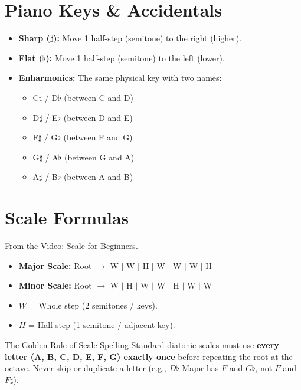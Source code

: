 
\section{Piano Keys \& Accidentals}

\begin{itemize}
    \item \textbf{Sharp ($\sharp$):} Move 1 half-step (semitone) to the right (higher).
    \item \textbf{Flat ($\flat$):} Move 1 half-step (semitone) to the left (lower).
    \item \textbf{Enharmonics:} The same physical key with two names:
    \begin{itemize}
        \item C$\sharp$ / D$\flat$ (between C and D)
        \item D$\sharp$ / E$\flat$ (between D and E)
        \item F$\sharp$ / G$\flat$ (between F and G)
        \item G$\sharp$ / A$\flat$ (between G and A)
        \item A$\sharp$ / B$\flat$ (between A and B)
    \end{itemize}
\end{itemize}

\section{Scale Formulas}

From the \href{https://www.youtube.com/watch?v=GugYaekR8KQ}{Video: Scale for Beginners}.

\begin{itemize}
    \item \textbf{Major Scale:} Root $\rightarrow$ W $\mid$ W $\mid$ H $\mid$ W $\mid$ W $\mid$ W $\mid$ H
    \item \textbf{Minor Scale:} Root $\rightarrow$ W $\mid$ H $\mid$ W $\mid$ W $\mid$ H $\mid$ W $\mid$ W
    \item $W$ = Whole step (2 semitones / keys).
    \item $H$ = Half step (1 semitone / adjacent key).
\end{itemize}

\begin{warningbox}{The Golden Rule of Scale Spelling}
Standard diatonic scales must use \textbf{every letter (A, B, C, D, E, F, G) exactly once} before repeating the root at the octave. Never skip or duplicate a letter (e.g., $D\flat$ Major has $F$ and $G\flat$, not $F$ and $F\sharp$).
\end{warningbox}

